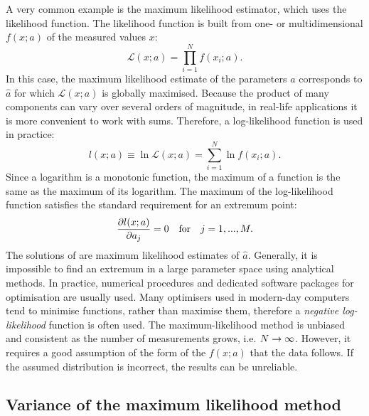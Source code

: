 A very common example is the maximum likelihood estimator, which uses the likelihood function.
The likelihood function is built from one- or multidimensional \PDF $f(x;a)$ of the measured values $x$:
\begin{equation}\label{eq:likelihood_equation}
    \mathcal{L}(x;a) = \prod_{i=1}^N f(x_i; a).
\end{equation}
In this case, the maximum likelihood estimate of the parameters $a$ corresponds to $\hat{a}$ for which $\mathcal{L}(x;a)$ is globally maximised.
Because the product of many components can vary over several orders of magnitude, in real-life applications it is more convenient to work with sums.
Therefore, a log-likelihood function is used in practice:
\begin{equation}
    l(x;a) \equiv \ln\mathcal{L}(x;a) = \sum_{i=1}^N \ln f(x_i;a).
\end{equation}
Since a logarithm is a monotonic function, the maximum of a function is the same as the maximum of its logarithm. 
The maximum of the log-likelihood function satisfies the standard requirement for an extremum point:
\begin{equation}\label{eq:likelihood_derivative}
    \pdv{l(x;a)}{a_j}=0 \quad \mathrm{for} \quad j=1,...,M.
\end{equation}
The solutions of  are maximum likelihood estimates of $\hat{a}$. Generally, it is impossible to find an extremum in a large parameter space using analytical methods.
In practice, numerical procedures and dedicated software packages for optimisation are usually used.
Many optimisers used in modern-day computers tend to minimise functions, rather than maximise them, therefore a \textit{negative log-likelihood} function is often used.
The maximum-likelihood method is unbiased and consistent as the number of measurements grows, i.e. $N\rightarrow\infty$.
However, it requires a good assumption of the form of the \PDF $f(x;a)$ that the data follows. 
If the assumed distribution is incorrect, the results can be unreliable.

\subsection{Variance of the maximum likelihood method}\label{sec:mle_variance}

